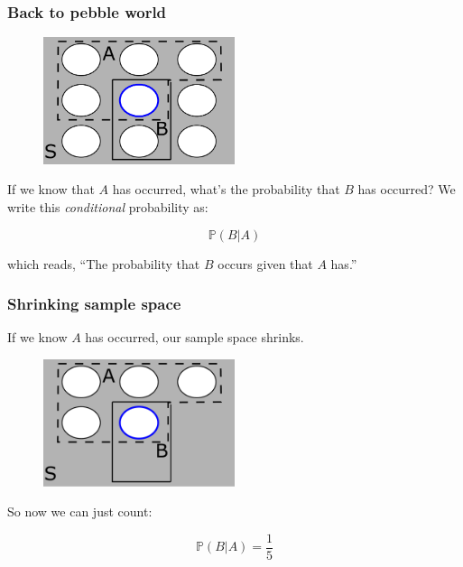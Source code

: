 \documentclass{beamer}
\begin{document}
	\begin{frame}
		\frametitle{Back to pebble world}
		
		\begin{figure}[ht]
			\centerline{\includegraphics[width=0.5\textwidth]{./figures/pebble_world_and.png}}
		\end{figure}
		
		If we know that $A$ has occurred, what's the probability that $B$ has occurred? We write this \textit{conditional} probability as:
		
		\begin{equation}
			\mathbb{P}(B|A)
		\end{equation}
	
		which reads, ``The probability that $B$ occurs given that $A$ has.''
		
	\end{frame}

	\begin{frame}
		\frametitle{Shrinking sample space}
		
		If we know $A$ has occurred, our sample space shrinks.
		
		\begin{figure}[ht]
			\centerline{\includegraphics[width=0.5\textwidth]{./figures/pebble_world_conditional.pdf}}
		\end{figure}
	
		So now we can just count:
		
		\begin{equation}
			\mathbb{P}(B|A) = \frac{1}{5}
		\end{equation}
		
	\end{frame}
\end{document}

